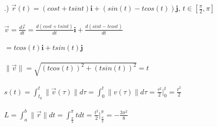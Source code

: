 \documentclass[12pt]{article}
\begin{document}
.) $\vec{r}(t) = (cos{t} + tsin{t})\mathbf{i} + (sin(t) - tcos(t))\mathbf{j}$, \hspace{10pt} $t \in [\frac{\pi}{2}, \pi]$\\\\
\noindent $\vec{v} = \frac{d\vec{r}}{dt} = \frac{d(cos{t} + tsin{t})}{dt}\mathbf{i} + \frac{d(sin{t} - tcos{t})}{dt}$\\\\
\noindent $ = tcos(t)\mathbf{i} + tsin(t)\mathbf{j}$\\\\
\noindent $\| \vec{v} \| = \sqrt{(tcos(t))^{2} + (tsin(t))^{2}} = t$\\\\
\noindent $s(t) = \int_{t_{0}}^{t} \| \vec{v}(\tau) \| d\tau = \int_{0}^{t} \| v(\tau) \| d\tau  = \frac{\tau^{2}}{2} \Big|_0^t= \frac{t^{2}}{2}$\\\\
\noindent $L = \int_{a}^{b} \| \vec{r} \|  dt = \int_{\frac{\pi}{2}}^{\pi}t  dt = \frac{t^{2}}{2} \Big|_{\frac{\pi}{2}}^{\pi} = -\frac{3\pi^{2}}{8}$\\\\
\end{document}
